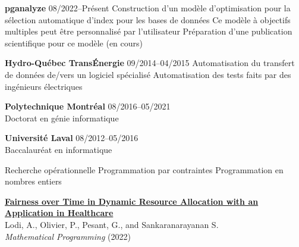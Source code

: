 \documentclass{memoir}
\begin{document}
\par
\vspace{1.5\baselineskip}
\begin{list}{}{
    \setlength\leftmargin{1.2in}
    \setlength\rightmargin{0in}
    \setlength{}
    \setlength{}
    \setlength\listparindent{0in}
    \setlength\itemindent{0in}
    \setlength\parskip{0in}
    \setlength\topsep{0in}
    \setlength\parsep{0in}
    \setlength\itemsep{0.90\baselineskip}
    \setlength\partopsep{0in}}

  


  \Item \textbf{pganalyze} \hfill 08/2022--Présent
  \BulletItem Construction d'un modèle d'optimisation pour la sélection automatique d'index pour les bases de données
  \BulletItem Ce modèle à objectifs multiples peut être personnalisé par l'utilisateur
  \BulletItem Préparation d'une publication scientifique pour ce modèle (en cours)



  \Item \textbf{Hydro-Québec TransÉnergie} \hfill 09/2014--04/2015
  \BulletItem Automatisation du transfert de données de/vers un logiciel spécialisé
  \BulletItem Automatisation des tests faits par des ingénieurs électriques

  

  \Item \textbf{Polytechnique Montréal} \hfill 08/2016--05/2021 \\
  Doctorat en génie informatique

  \Item \textbf{Université Laval} \hfill 08/2012--05/2016 \\
  Baccalauréat en informatique

  

  
  \BulletItem Recherche opérationnelle
  \BulletItem Programmation par contraintes
  \BulletItem Programmation en nombres entiers

  

  \Item \href{https://arxiv.org/abs/2101.03716}{\textbf{Fairness over Time in Dynamic Resource Allocation with an Application in Healthcare}} \\
  Lodi, A., Olivier, P., Pesant, G., and Sankaranarayanan S. \\
  \emph{Mathematical Programming} (2022)


\end{list}
\end{document}

